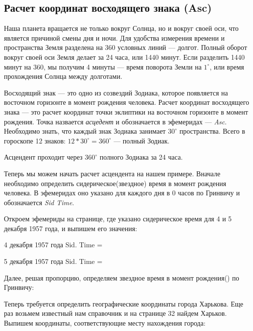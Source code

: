 \subsection{Расчет координат восходящего знака (Asc)}

Наша планета вращается не только вокруг Солнца, но и вокруг своей оси, что является причиной смены дня и ночи. Для удобства измерения времени и пространства Земля разделена на 360 условных линий --- долгот. Полный оборот вокруг своей оси Земля делает за 24 часа, или 1440 минут. Если разделить 1440 минут на 360, мы получим 4 минуты --- время поворота Земли на \(1^\circ\), или время прохождения Солнца между долготами.

Восходящий знак --- это одно из созвездий Зодиака, которое появляется на восточном горизонте в момент рождения человека. Расчет координат восходящего знака --- это расчет координат точки эклиптики на восточном горизонте в момент рождения. Точка назвается \emph{асцедент} и обозначается в эфемеридах --- \emph{Asc}. Необходимо знать, что каждый знак Зодиака занимает \(30^\circ\) пространства. Всего в гороскопе 12 знаков: \(12 * 30^\circ = 360^\circ\) --- полный Зодиак.

Асцендент проходит через \(360^\circ\) полного Зодиака за 24 часа.

Теперь мы можем начать расчет асцендента на нашем примере. Вначале необходимо определить сидерическое(звездное) время в момент рождения человека. В эфемеридах оно указано для каждого дня в 0 часов по Гринвичу и обозначается \emph{Sid Time}.

Откроем эфемериды на странице, где указано сидерическое время для 4 и 5 декабря 1957 года, и выпишем его значения:

\begin{mylist}
	\item 4 декабря 1957 года Sid. Time = 
	\item 5 декабря 1957 года Sid. Time = 
\end{mylist}

Далее, решая пропорцию, определяем звездное время в момент рождения() по Гринвичу:


Теперь требуется определить географические координаты города Харькова. Еще раз возьмем известный нам справочник и на странице 32 найдем Харьков. Выпишем координаты, соответствующие месту нахождения города:

